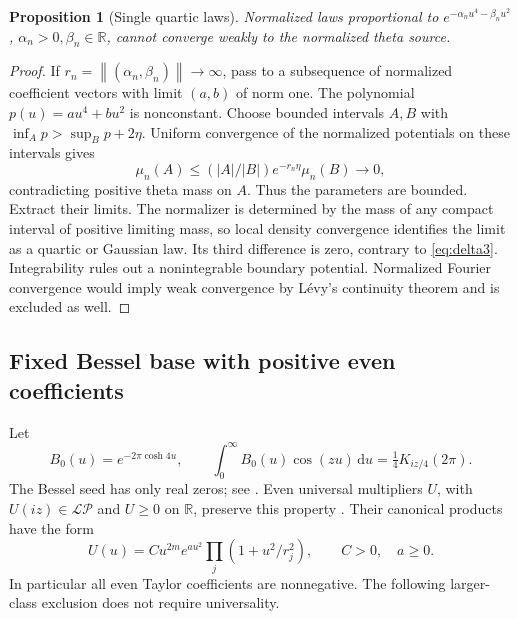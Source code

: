 \documentclass[11pt]{article}
\newtheorem{proposition}[theorem]{Proposition}
\theoremstyle{remark}
\newcommand{\R}{\mathbb R}
\newcommand{\dd}{\,\mathrm d}
\newcommand{\LP}{\mathcal{LP}}
\newcommand{\norm}[1]{\left\lVert#1\right\rVert}
\numberwithin{equation}{section}
\begin{document}
\begin{proposition}[Single quartic laws]\label{prop:single}
Normalized laws proportional to
\(e^{-\alpha_nu^4-\beta_nu^2}\), \(\alpha_n>0,\beta_n\in\R\), cannot
converge weakly to the normalized theta source.
\end{proposition}
\begin{proof}
If \(r_n=\norm{(\alpha_n,\beta_n)}\to\infty\), pass to a subsequence of
normalized coefficient vectors with limit \((a,b)\) of norm one.
The polynomial \(p(u)=au^4+bu^2\) is nonconstant. Choose bounded intervals
\(A,B\) with \(\inf_Ap>\sup_Bp+2\eta\). Uniform convergence of the
normalized potentials on these intervals gives
\[
 \mu_n(A)\le(|A|/|B|)e^{-r_n\eta}\mu_n(B)\longrightarrow0,
\]
contradicting positive theta mass on \(A\).
Thus the parameters are bounded. Extract their limits. The normalizer
is determined by the mass of any compact interval of positive limiting
mass, so local density convergence identifies the limit as a quartic
or Gaussian law. Its third difference is zero, contrary to
\eqref{eq:delta3}. Integrability rules out a nonintegrable boundary
potential. Normalized Fourier convergence would imply weak convergence
by L\'evy's continuity theorem and is excluded as well.
\end{proof}

\subsection{Fixed Bessel base with positive even coefficients}
Let
\begin{equation}\label{eq:bessel}
 B_0(u)=e^{-2\pi\cosh4u},\qquad
 \int_0^\infty B_0(u)\cos(zu)\dd u=\tfrac14K_{iz/4}(2\pi).
\end{equation}
The Bessel seed has only real zeros; see \cite{gasper,dlmf}.
Even universal multipliers \(U\), with \(U(iz)\in\LP\) and
\(U\ge0\) on \(\R\), preserve this property \cite[Proposition 1]{cardon}.
Their canonical products have the form
\[
 U(u)=Cu^{2m}e^{au^2}\prod_j(1+u^2/r_j^2),
 \qquad C>0,\quad a\ge0.
\]
In particular all even Taylor coefficients are nonnegative.
The following larger-class exclusion does not require universality.
\end{document}
